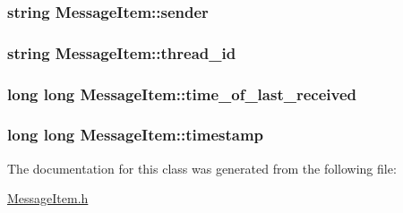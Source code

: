 \hypertarget{classMessageItem_afb790d4667b4a08a232238aef00b7a76}{
\subsubsection[{sender}]{\setlength{\rightskip}{0pt plus 5cm}string Message\+Item\+::sender\hspace{0.3cm}{\ttfamily [private]}}}\label{classMessageItem_afb790d4667b4a08a232238aef00b7a76}
\hypertarget{classMessageItem_acf5579e8d79d606871030947475d8a3f}{
\subsubsection[{thread\+\_\+id}]{\setlength{\rightskip}{0pt plus 5cm}string Message\+Item\+::thread\+\_\+id\hspace{0.3cm}{\ttfamily [private]}}}\label{classMessageItem_acf5579e8d79d606871030947475d8a3f}
\hypertarget{classMessageItem_a073585e6e50c6074f1f9aa41b866a2d6}{
\subsubsection[{time\+\_\+of\+\_\+last\+\_\+received}]{\setlength{\rightskip}{0pt plus 5cm}long long Message\+Item\+::time\+\_\+of\+\_\+last\+\_\+received\hspace{0.3cm}{\ttfamily [private]}}}\label{classMessageItem_a073585e6e50c6074f1f9aa41b866a2d6}
\hypertarget{classMessageItem_a4f9fcf97f987eb78bcf290f7acf8c8ac}{
\subsubsection[{timestamp}]{\setlength{\rightskip}{0pt plus 5cm}long long Message\+Item\+::timestamp\hspace{0.3cm}{\ttfamily [private]}}}\label{classMessageItem_a4f9fcf97f987eb78bcf290f7acf8c8ac}


The documentation for this class was generated from the following file\+:\begin{DoxyCompactItemize}
\item 
\hyperlink{MessageItem_8h}{Message\+Item.\+h}\end{DoxyCompactItemize}
